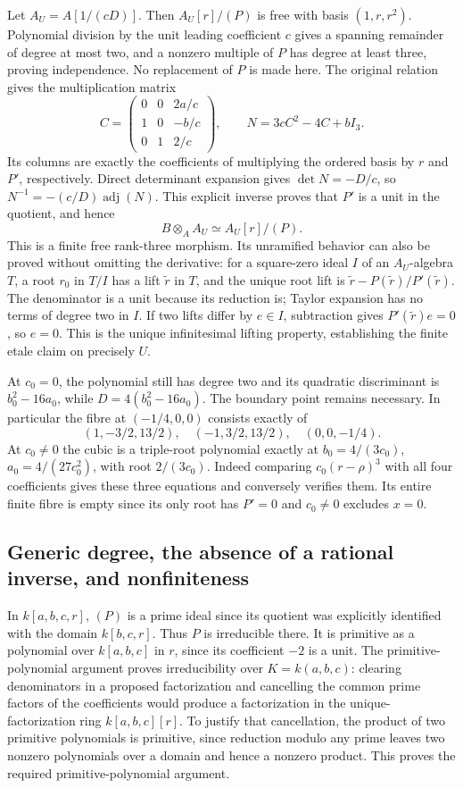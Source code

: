 Let $A_U=A[1/(cD)]$. Then $A_U[r]/(P)$ is free with basis
$(1,r,r^2)$. Polynomial division by the unit leading coefficient $c$
gives a spanning remainder of degree at most two, and a nonzero multiple
of $P$ has degree at least three, proving independence. No replacement
of $P$ is made here. The original relation gives the multiplication matrix
\[
 C=\begin{pmatrix}
 0&0&2a/c\\1&0&-b/c\\0&1&2/c
 \end{pmatrix},\qquad
 N=3cC^2-4C+bI_3.
\]
Its columns are exactly the coefficients of multiplying the ordered
basis by $r$ and $P'$, respectively. Direct determinant expansion gives
$\det N=-D/c$, so
$N^{-1}=-(c/D)\operatorname{adj}(N)$. This explicit inverse proves that
$P'$ is a unit in the quotient, and hence
\[
 B\otimes_A A_U\simeq A_U[r]/(P).
\]
This is a finite free rank-three morphism. Its unramified behavior can
also be proved without omitting the derivative: for a square-zero ideal
$I$ of an $A_U$-algebra $T$, a root $r_0$ in $T/I$ has a lift
$\widetilde r$ in $T$, and the unique root lift is
$\widetilde r-P(\widetilde r)/P'(\widetilde r)$.
The denominator is a unit because its reduction is; Taylor expansion
has no terms of degree two in $I$. If two lifts differ by $e\in I$,
subtraction gives $P'(\widetilde r)e=0$, so $e=0$. This is the
unique infinitesimal lifting property, establishing the finite etale
claim on precisely $U$.

At $c_0=0$, the polynomial still has degree two and its quadratic
discriminant is $b_0^2-16a_0$, while $D=4(b_0^2-16a_0)$. The
boundary point remains necessary. In particular the fibre at
$(-1/4,0,0)$ consists exactly of
\[
 (1,-3/2,13/2),\quad(-1,3/2,13/2),\quad(0,0,-1/4).
\]
At $c_0\ne0$ the cubic is a triple-root polynomial exactly at
$b_0=4/(3c_0)$, $a_0=4/(27c_0^2)$, with root $2/(3c_0)$.
Indeed comparing $c_0(r-\rho)^3$ with all four coefficients gives
these three equations and conversely verifies them. Its entire finite
fibre is empty since its only root has $P'=0$ and $c_0\ne0$ excludes
$x=0$.

\subsection{Generic degree, the absence of a rational inverse, and nonfiniteness}

In $k[a,b,c,r]$, $(P)$ is a prime ideal since its quotient was explicitly
identified with the domain $k[b,c,r]$. Thus $P$ is irreducible there.
It is primitive as a polynomial over $k[a,b,c]$ in $r$, since its
coefficient $-2$ is a unit. The primitive-polynomial argument proves
irreducibility over $K=k(a,b,c)$: clearing denominators in a proposed
factorization and cancelling the common prime factors of the coefficients
would produce a factorization in the unique-factorization ring
$k[a,b,c][r]$. To justify that cancellation, the product of two primitive
polynomials is primitive, since reduction modulo any prime leaves two
nonzero polynomials over a domain and hence a nonzero product. This
proves the required primitive-polynomial argument.

